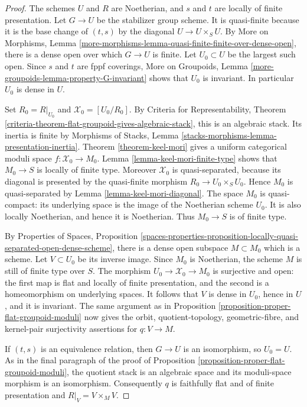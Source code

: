 \begin{proof}
The schemes $U$ and $R$ are Noetherian, and $s$ and $t$ are locally of
finite presentation. Let $G \to U$ be the stabilizer group scheme.
It is quasi-finite because it is the base change of $(t, s)$ by the
diagonal $U \to U \times_S U$. By More on Morphisms, Lemma
\ref{more-morphisms-lemma-quasi-finite-finite-over-dense-open}, there
is a dense open over which $G \to U$ is finite. Let $U_0 \subset U$
be the largest such open. Since $s$ and $t$ are fppf coverings,
More on Groupoids, Lemma
\ref{more-groupoids-lemma-property-G-invariant} shows that $U_0$ is
invariant. In particular $U_0$ is dense in $U$.

Set $R_0 = R|_{U_0}$ and $\mathcal{X}_0 = [U_0/R_0]$. By Criteria for
Representability, Theorem
\ref{criteria-theorem-flat-groupoid-gives-algebraic-stack}, this is an
algebraic stack. Its inertia is finite by Morphisms of Stacks, Lemma
\ref{stacks-morphisms-lemma-presentation-inertia}. Theorem
\ref{theorem-keel-mori} gives a uniform categorical moduli space
$f : \mathcal{X}_0 \to M_0$. Lemma
\ref{lemma-keel-mori-finite-type} shows that $M_0 \to S$ is locally of
finite type. Moreover $\mathcal{X}_0$ is quasi-separated, because its
diagonal is presented by the quasi-finite morphism
$R_0 \to U_0 \times_S U_0$. Hence $M_0$ is quasi-separated by
Lemma \ref{lemma-keel-mori-diagonal}. The space $M_0$ is quasi-compact:
its underlying space is the image of the Noetherian scheme $U_0$.
It is also locally Noetherian, and hence it is Noetherian. Thus
$M_0 \to S$ is of finite type.

By Properties of Spaces, Proposition
\ref{spaces-properties-proposition-locally-quasi-separated-open-dense-scheme},
there is a dense open subspace $M \subset M_0$ which is a scheme. Let
$V \subset U_0$ be its inverse image. Since $M_0$ is Noetherian, the
scheme $M$ is still of finite type over $S$. The morphism
$U_0 \to \mathcal{X}_0 \to M_0$ is surjective and open: the first
map is flat and locally of finite presentation, and the second is a
homeomorphism on underlying spaces. It follows that $V$ is dense in
$U_0$, hence in $U$, and it is invariant. The same argument as in
Proposition \ref{proposition-proper-flat-groupoid-moduli} now gives
the orbit, quotient-topology, geometric-fibre, and kernel-pair
surjectivity assertions for $q : V \to M$.

If $(t, s)$ is an equivalence relation, then $G \to U$ is an
isomorphism, so $U_0=U$. As in the final paragraph of the proof of
Proposition \ref{proposition-proper-flat-groupoid-moduli}, the quotient
stack is an algebraic space and its moduli-space morphism is an
isomorphism. Consequently $q$ is faithfully flat and of finite
presentation and $R|_V = V \times_M V$.
\end{proof}





